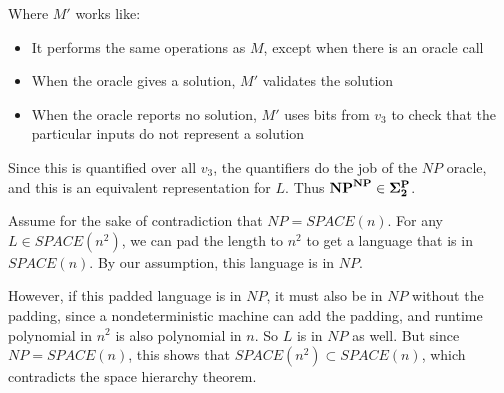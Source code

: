 \documentclass{article}
\newenvironment{problem}[2][Problem]{\begin{trivlist}
\item[\hskip \labelsep {\bfseries #1}\hskip \labelsep {\bfseries #2.}]}{\end{trivlist}}
\begin{document}
\begin{problem}{1}
  Where $M'$ works like:
  
  \begin{itemize}
    \item It performs the same operations as $M$, except when there is
      an oracle call
    \item When the oracle gives a solution, $M'$ validates the
      solution
    \item When the oracle reports no solution, $M'$ uses bits from
      $v_3$ to check that the particular inputs do not represent a solution
  \end{itemize}

  Since this is quantified over all $v_3$, the quantifiers do the job
  of the $NP$ oracle, and this is an equivalent representation for
  $L$. Thus $\bf{NP}^{\bf{NP}} \in \Sigma_2^{\bf{P}}$.
  
\end{problem}

\begin{problem}{2}

  Assume for the sake of contradiction that $NP = SPACE(n)$. For any
  $L \in SPACE(n^2)$, we can pad the length to $n^2$ to get a
  language that is in $SPACE(n)$. By our assumption, this language is
  in $NP$.

  However, if this padded language is in $NP$, it must also be in $NP$
  without the padding, since a nondeterministic machine can add the
  padding, and runtime polynomial in $n^2$ is also polynomial in
  $n$. So $L$ is in $NP$ as well. But since $NP = SPACE(n)$, this
  shows that $SPACE(n^2) \subset SPACE(n)$, which contradicts the
  space hierarchy theorem.
  
\end{problem}
\end{document}
